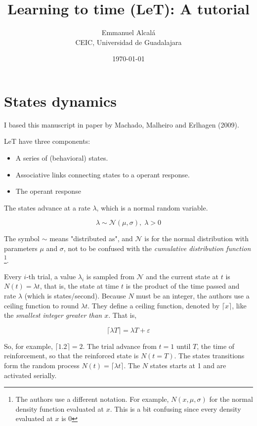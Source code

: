 \documentclass[11pt]{article}
\title{\color{tit} \textsf{\textbf{Learning to time (LeT): A tutorial}}}
\author{\normalsize Emmanuel Alcalá\\
        \normalsize CEIC, Universidad de Guadalajara}
\date{\today}
\begin{document}
    \maketitle

    \section{States dynamics}

I based this manuscript in paper by Machado, Malheiro and Erlhagen (2009).

LeT have three components:

    \begin{itemize}
        \item A series of (behavioral) states.
        \item Associative links connecting states to a operant response.
        \item The operant response
    \end{itemize}

The states advance at a rate $\lambda$, which is a normal random variable.

    \[
        \lambda \sim \mathcal{N} (\mu, \sigma),\; \lambda > 0
    \]

    The symbol $\sim$ means "distributed as", and $\mathcal{N}$ is for the normal distribution with parameters
    $\mu$ and $\sigma$, not to be confused with the \textit{cumulative distribution function} \footnote{The authors use
        a different notation. For example, $N(x,\mu,\sigma)$ for the normal density function evaluated at $x$. This is a
        bit confusing since every density evaluated at $x$ is 0}.

Every $i$-th trial, a value $\lambda_i$ is sampled from $\mathcal{N}$ and the current state at $t$ is $N(t) = \lambda t$, that is,
the state at time $t$ is the product of the time passed and rate $\lambda$ (which is states/second).
Because $N$ must be an integer, the authors use a ceiling function to round $\lambda t$.
They define a ceiling function, denoted by $\lceil x \rceil$, like the \textit{smallest integer greater than $x$}.
That is,

    \[
        \lceil \lambda T \rceil = \lambda T + \varepsilon
    \]

So, for example, $\lceil 1.2 \rceil = 2$. The trial advance from $t = 1$ until $T$, the time of reinforcement, so that the
reinforced state is $N(t = T)$.
    The states transitions form the random process $N(t) = \lceil {\lambda t} \rceil$.
    The $N$ states starts at 1 and are activated serially.
\end{document}
